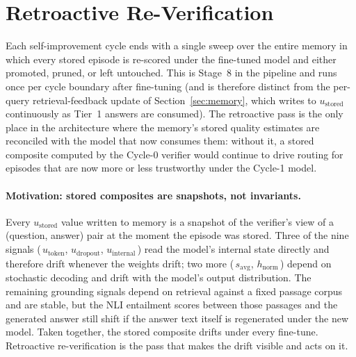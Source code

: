 \section{Retroactive Re-Verification}
\label{sec:retroverify}

Each self-improvement cycle ends with a single sweep over the entire memory in which every stored episode is re-scored under the fine-tuned model and either promoted, pruned, or left untouched. This is Stage~8 in the pipeline and runs once per cycle boundary after fine-tuning (and is therefore distinct from the per-query retrieval-feedback update of Section~\ref{sec:memory}, which writes to $u_{\text{stored}}$ continuously as Tier~1 answers are consumed). The retroactive pass is the only place in the architecture where the memory's stored quality estimates are reconciled with the model that now consumes them: without it, a stored composite computed by the Cycle-0 verifier would continue to drive routing for episodes that are now more or less trustworthy under the Cycle-1 model.

\paragraph{Motivation: stored composites are snapshots, not invariants.}
Every $u_{\text{stored}}$ value written to memory is a snapshot of the verifier's view of a (question, answer) pair at the moment the episode was stored. Three of the nine signals (\,$u_{\text{token}}$, $u_{\text{dropout}}$, $u_{\text{internal}}$\,) read the model's internal state directly and therefore drift whenever the weights drift; two more (\,$s_{\text{avg}}$, $h_{\text{norm}}$\,) depend on stochastic decoding and drift with the model's output distribution. The remaining grounding signals depend on retrieval against a fixed passage corpus and are stable, but the NLI entailment scores between those passages and the generated answer still shift if the answer text itself is regenerated under the new model. Taken together, the stored composite drifts under every fine-tune. Retroactive re-verification is the pass that makes the drift visible and acts on it.

